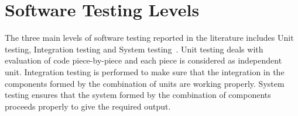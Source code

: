 %
%
%
%



\section{Software Testing Levels}
The three main levels of software testing reported in the literature includes Unit testing, Integration testing and System testing~\cite{chilenski1994applicability}. Unit testing deals with evaluation of code piece-by-piece and each piece is considered as independent unit. Integration testing is performed to make sure that the integration in the components formed by the combination of units are working properly. System testing ensures that the system formed by the combination of components proceeds properly to give the required output.

